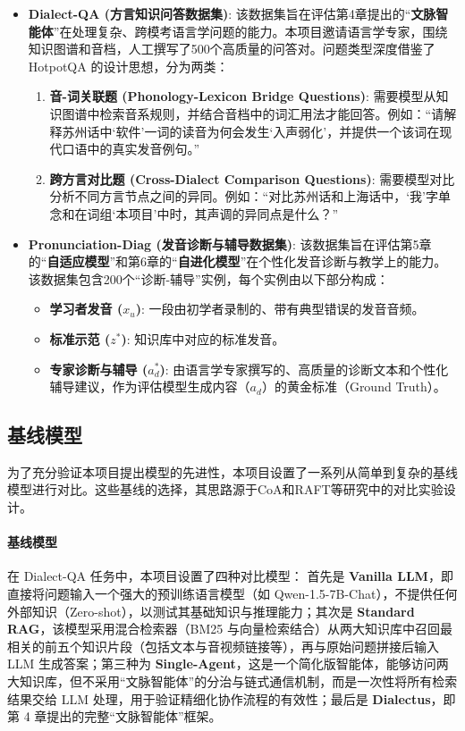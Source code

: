 \begin{itemize}
    \item \textbf{Dialect-QA (方言知识问答数据集)}: 该数据集旨在评估第4章提出的“\textbf{文脉智能体}”在处理复杂、跨模考语言学问题的能力。本项目邀请语言学专家，围绕知识图谱和音档，人工撰写了500个高质量的问答对。问题类型深度借鉴了HotpotQA 的设计思想，分为两类：
    \begin{enumerate}
        \item \textbf{音-词关联题 (Phonology-Lexicon Bridge Questions)}: 需要模型从知识图谱中检索音系规则，并结合音档中的词汇用法才能回答。例如：“请解释苏州话中‘软件’一词的读音为何会发生‘入声弱化’，并提供一个该词在现代口语中的真实发音例句。”
        \item \textbf{跨方言对比题 (Cross-Dialect Comparison Questions)}: 需要模型对比分析不同方言节点之间的异同。例如：“对比苏州话和上海话中，‘我’字单念和在词组‘本项目’中时，其声调的异同点是什么？”
    \end{enumerate}

    \item \textbf{Pronunciation-Diag (发音诊断与辅导数据集)}: 该数据集旨在评估第5章的“\textbf{自适应模型}”和第6章的“\textbf{自进化模型}”在个性化发音诊断与教学上的能力。该数据集包含200个“诊断-辅导”实例，每个实例由以下部分构成：
    \begin{itemize}
        \item \textbf{学习者发音 ($x_u$)}: 一段由初学者录制的、带有典型错误的发音音频。
        \item \textbf{标准示范 ($z^*$)}: 知识库中对应的标准发音。
        \item \textbf{专家诊断与辅导 ($a_d^*$)}: 由语言学专家撰写的、高质量的诊断文本和个性化辅导建议，作为评估模型生成内容（$a_d$）的黄金标准（Ground Truth）。
    \end{itemize}
\end{itemize}

\subsection{基线模型}
为了充分验证本项目提出模型的先进性，本项目设置了一系列从简单到复杂的基线模型进行对比。这些基线的选择，其思路源于CoA和RAFT等研究中的对比实验设计。

\paragraph{基线模型}

在 Dialect-QA 任务中，本项目设置了四种对比模型：  
首先是 \textbf{Vanilla LLM}，即直接将问题输入一个强大的预训练语言模型（如 Qwen-1.5-7B-Chat），不提供任何外部知识（Zero-shot），以测试其基础知识与推理能力；其次是 \textbf{Standard RAG}，该模型采用混合检索器（BM25 与向量检索结合）从两大知识库中召回最相关的前五个知识片段（包括文本与音视频链接等），再与原始问题拼接后输入 LLM 生成答案；第三种为 \textbf{Single-Agent}，这是一个简化版智能体，能够访问两大知识库，但不采用“文脉智能体”的分治与链式通信机制，而是一次性将所有检索结果交给 LLM 处理，用于验证精细化协作流程的有效性；最后是 \textbf{Dialectus}，即第 4 章提出的完整“文脉智能体”框架。

